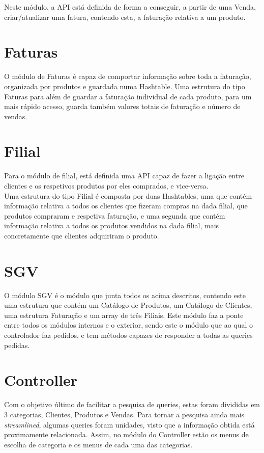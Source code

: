 \documentclass[a4paper]{report}
\begin{document}
Neste módulo, a API está definida de forma a conseguir, a partir de uma Venda,
criar/atualizar uma fatura, contendo esta, a faturação relativa a um produto.

\section{Faturas}

O módulo de Faturas é capaz de comportar informação sobre toda a faturação,
organizada por produtos e guardada numa Hashtable. Uma estrutura do tipo Faturas
para além de guardar a faturação individual de cada produto, para um mais rápido 
acesso, guarda também valores totais de faturação e número de vendas.

\section{Filial}

Para o módulo de filial, está definida uma API capaz de fazer a ligação entre 
clientes e os respetivos produtos por eles comprados, e vice-versa.\\
Uma estrutura do tipo Filial é composta por duas Hashtables, uma que contém
informação relativa a todos os clientes que fizeram compras na dada filial, 
que produtos compraram e respetiva faturação, e uma segunda que contém 
informação relativa a todos os produtos vendidos na dada filial, mais 
concretamente que clientes adquiriram o produto.

\section{SGV}

O módulo SGV é o módulo que junta todos os acima descritos, contendo este uma estrutura
que contém um Catálogo de Produtos, um Catálogo de Clientes, uma estrutura Faturação e 
um array de três Filiais. Este módulo faz a ponte entre todos os módulos internos e o 
exterior, sendo este o módulo que ao qual o controlador faz pedidos, e tem 
métodos capazes de responder a todas as queries pedidas.

\section{Controller}

Com o objetivo último de facilitar a pesquisa de queries, estas foram divididas em 3 categorias,
Clientes, Produtos e Vendas. Para tornar a pesquisa ainda mais \textit{streamlined},
algumas queries foram unidades, visto que a informação obtida está proximamente relacionada.
Assim, no módulo do Controller estão os menus de escolha de categoria
e os menus de cada uma das categorias.
\end{document}
